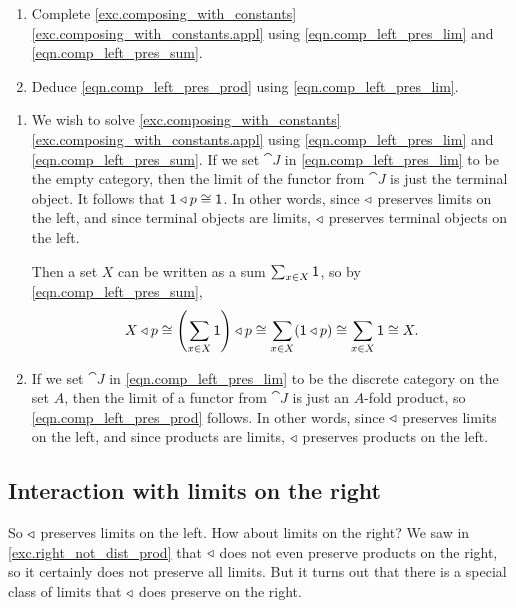 \documentclass[Book-Poly]{subfiles}
\begin{document}
\begin{exercise} \label{exc.comp_left_pres_lim}
\begin{enumerate}
    \item Complete \cref{exc.composing_with_constants} \cref{exc.composing_with_constants.appl} using \eqref{eqn.comp_left_pres_lim} and \eqref{eqn.comp_left_pres_sum}.
    \item \label{exc.comp_left_pres_lim.prod} Deduce \eqref{eqn.comp_left_pres_prod} using \eqref{eqn.comp_left_pres_lim}.\qedhere
\end{enumerate}
\begin{solution}
\begin{enumerate}
    \item We wish to solve \cref{exc.composing_with_constants} \cref{exc.composing_with_constants.appl} using \eqref{eqn.comp_left_pres_lim} and \eqref{eqn.comp_left_pres_sum}.
    If we set $\cat{J}$ in \eqref{eqn.comp_left_pres_lim} to be the empty category, then the limit of the functor from $\cat{J}$ is just the terminal object.
    It follows that $\textsf{1}\mathbin{\triangleleft} p\cong\textsf{1}$.
    In other words, since $\mathbin{\triangleleft}$ preserves limits on the left, and since terminal objects are limits, $\mathbin{\triangleleft}$ preserves terminal objects on the left.
    
    Then a set $X$ can be written as a sum $\sum_{x\in X}\textsf{1}$, so by \eqref{eqn.comp_left_pres_sum},
    \[
        X\mathbin{\triangleleft} p\cong\left(\sum_{x\in X}\textsf{1}\right)\mathbin{\triangleleft} p\cong\sum_{x\in X}(\textsf{1}\mathbin{\triangleleft} p)\cong\sum_{x\in X}\textsf{1}\cong X.
    \]
    
    \item If we set $\cat{J}$ in \eqref{eqn.comp_left_pres_lim} to be the discrete category on the set $A$, then the limit of a functor from $\cat{J}$ is just an $A$-fold product, so \eqref{eqn.comp_left_pres_prod} follows.
    In other words, since $\mathbin{\triangleleft}$ preserves limits on the left, and since products are limits, $\mathbin{\triangleleft}$ preserves products on the left.
\end{enumerate}
\end{solution}
\end{exercise}


\subsection{Interaction with limits on the right} \label{subsec.comon.comp.prop.lim_right}

So $\mathbin{\triangleleft}$ preserves limits on the left.
How about limits on the right?
We saw in \cref{exc.right_not_dist_prod} that $\mathbin{\triangleleft}$ does not even preserve products on the right, so it certainly does not preserve all limits.
But it turns out that there is a special class of limits that $\mathbin{\triangleleft}$ does preserve on the right.
\end{document}
